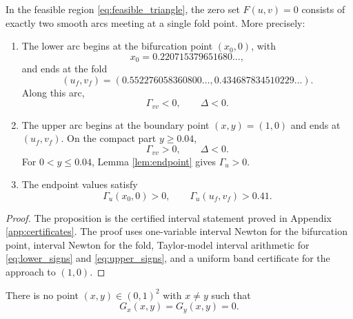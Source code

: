 \begin{proposition}\label{prop:branch}
In the feasible region \eqref{eq:feasible_triangle}, the zero set \(F(u,v)=0\) consists of exactly two smooth arcs meeting at a single fold point.  More precisely:
\begin{enumerate}[label=(\roman*)]
\item The lower arc begins at the bifurcation point \((x_0,0)\), with
\begin{equation}\label{eq:x0_num}
  x_0=0.220715379651680\ldots,
\end{equation}
and ends at the fold
\begin{equation}\label{eq:fold_num}
  (u_f,v_f)=(0.552276058360800\ldots,0.434687834510229\ldots).
\end{equation}
Along this arc,
\begin{equation}\label{eq:lower_signs}
  \Gamma_{vv}<0,
  \qquad
  \Delta<0.
\end{equation}
\item The upper arc begins at the boundary point \((x,y)=(1,0)\) and ends at \((u_f,v_f)\).  On the compact part \(y\ge0.04\),
\begin{equation}\label{eq:upper_signs}
  \Gamma_{vv}>0,
  \qquad
  \Delta<0.
\end{equation}
For \(0<y\le0.04\), Lemma \ref{lem:endpoint} gives \(\Gamma_u>0\).
\item The endpoint values satisfy
\begin{equation}\label{eq:endpoint_values_branch}
  \Gamma_u(x_0,0)>0,
  \qquad
  \Gamma_u(u_f,v_f)>0.41.
\end{equation}
\end{enumerate}
\end{proposition}

\begin{proof}
The proposition is the certified interval statement proved in Appendix \ref{app:certificates}.  The proof uses one-variable interval Newton for the bifurcation point, interval Newton for the fold, Taylor-model interval arithmetic for \eqref{eq:lower_signs} and \eqref{eq:upper_signs}, and a uniform band certificate for the approach to \((1,0)\).
\end{proof}

\begin{lemma}\label{lem:no_offdiag}
There is no point \((x,y)\in(0,1)^2\) with \(x\ne y\) such that
\begin{equation}\label{eq:no_offdiag_condition}
  G_x(x,y)=G_y(x,y)=0.
\end{equation}
\end{lemma}

